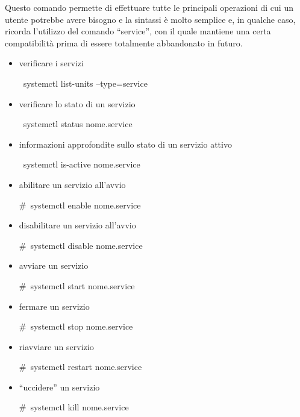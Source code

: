 Questo comando permette di effettuare tutte le principali operazioni di cui un utente potrebbe avere bisogno e la sintassi è molto semplice e, in qualche caso, ricorda l'utilizzo del comando ``service'', con il quale mantiene una certa compatibilità prima di essere totalmente abbandonato in futuro.
\begin{itemize}
\item verificare i servizi
\begin{shaded}
{\color[cmyk]{0, 0, 0, 0}\textdollar\ systemctl list-units --type=service}
\end{shaded}
\item verificare lo stato di un servizio
\begin{shaded}
{\color[cmyk]{0, 0, 0, 0}\textdollar\ systemctl status nome.service}
\end{shaded}
\item informazioni approfondite sullo stato di un servizio attivo
\begin{shaded}
{\color[cmyk]{0, 0, 0, 0}\textdollar\ systemctl is-active nome.service}
\end{shaded}
\item abilitare un servizio all'avvio
\begin{shaded}
{\color[cmyk]{0, 0, 0, 0}\#\ systemctl enable nome.service}
\end{shaded}
\item disabilitare un servizio all'avvio
\begin{shaded}
{\color[cmyk]{0, 0, 0, 0}\#\ systemctl disable nome.service}
\end{shaded}
\item avviare un servizio
\begin{shaded}
{\color[cmyk]{0, 0, 0, 0}\#\ systemctl start nome.service}
\end{shaded}
\item fermare un servizio
\begin{shaded}
{\color[cmyk]{0, 0, 0, 0}\#\ systemctl stop nome.service}
\end{shaded}
\item riavviare un servizio
\begin{shaded}
{\color[cmyk]{0, 0, 0, 0}\#\ systemctl restart nome.service}
\end{shaded}
\item ``uccidere'' un servizio
\begin{shaded}
{\color[cmyk]{0, 0, 0, 0}\#\ systemctl kill nome.service}
\end{shaded}
\end{itemize}


